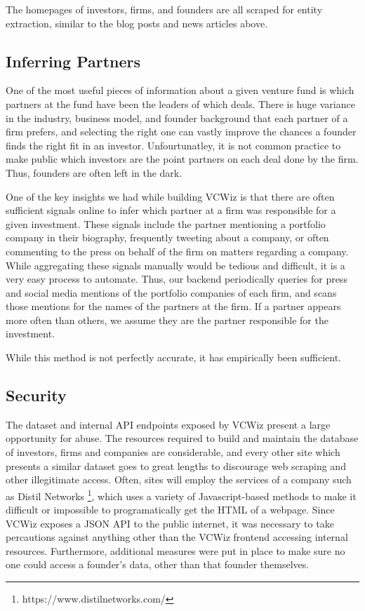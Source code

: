 The homepages of investors, firms, and founders are all scraped for entity extraction, similar to the blog posts and news articles above.

\subsection{Inferring Partners}

One of the most useful pieces of information about a given venture fund is which partners at the fund have been the leaders of which deals. There is huge variance in the industry, business model, and founder background that each partner of a firm prefers, and selecting the right one can vastly improve the chances a founder finds the right fit in an investor. Unfourtunatley, it is not common practice to make public which investors are the point partners on each deal done by the firm. Thus, founders are often left in the dark.

One of the key insights we had while building VCWiz is that there are often sufficient signals online to infer which partner at a firm was responsible for a given investment. These signals include the partner mentioning a portfolio company in their biography, frequently tweeting about a company, or often commenting to the press on behalf of the firm on matters regarding a company. While aggregating these signals manually would be tedious and difficult, it is a very easy process to automate. Thus, our backend periodically queries for press and social media mentions of the portfolio companies of each firm, and scans those mentions for the names of the partners at the firm. If a partner appears more often than others, we assume they are the partner responsible for the investment.

While this method is not perfectly accurate, it has empirically been sufficient.

\subsection{Security}

The dataset and internal API endpoints exposed by VCWiz present a large opportunity for abuse. The resources required to build and maintain the database of investors, firms and companies are considerable, and every other site which presents a similar dataset goes to great lengths to discourage web scraping and other illegitimate access. Often, sites will employ the services of a company such as Distil Networks \footnote{https://www.distilnetworks.com/}, which uses a variety of Javascript-based methods to make it difficult or impossible to programatically get the HTML of a webpage. Since VCWiz exposes a JSON API to the public internet, it was necessary to take percautions against anything other than the VCWiz frontend accessing internal resources. Furthermore, additional measures were put in place to make sure no one could access a founder's data, other than that founder themselves.

